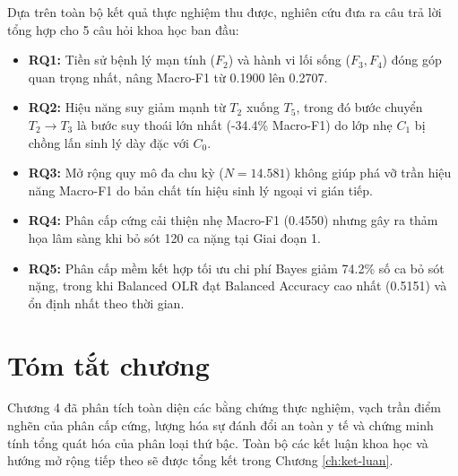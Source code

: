 Dựa trên toàn bộ kết quả thực nghiệm thu được, nghiên cứu đưa ra câu trả lời tổng hợp cho 5 câu hỏi khoa học ban đầu:
\begin{itemize}
    \item \textbf{RQ1:} Tiền sử bệnh lý mạn tính ($F_2$) và hành vi lối sống ($F_3, F_4$) đóng góp quan trọng nhất, nâng Macro-F1 từ 0.1900 lên 0.2707.
    \item \textbf{RQ2:} Hiệu năng suy giảm mạnh từ $T_2$ xuống $T_5$, trong đó bước chuyển $T_2 \to T_3$ là bước suy thoái lớn nhất (-34.4\% Macro-F1) do lớp nhẹ $C_1$ bị chồng lấn sinh lý dày đặc với $C_0$.
    \item \textbf{RQ3:} Mở rộng quy mô đa chu kỳ ($N=14.581$) không giúp phá vỡ trần hiệu năng Macro-F1 do bản chất tín hiệu sinh lý ngoại vi gián tiếp.
    \item \textbf{RQ4:} Phân cấp cứng cải thiện nhẹ Macro-F1 (0.4550) nhưng gây ra thảm họa lâm sàng khi bỏ sót 120 ca nặng tại Giai đoạn 1.
    \item \textbf{RQ5:} Phân cấp mềm kết hợp tối ưu chi phí Bayes giảm 74.2\% số ca bỏ sót nặng, trong khi Balanced OLR đạt Balanced Accuracy cao nhất (0.5151) và ổn định nhất theo thời gian.
\end{itemize}

\section{Tóm tắt chương}
\label{sec:tom-tat-chuong-4}

Chương 4 đã phân tích toàn diện các bằng chứng thực nghiệm, vạch trần điểm nghẽn của phân cấp cứng, lượng hóa sự đánh đổi an toàn y tế và chứng minh tính tổng quát hóa của phân loại thứ bậc. Toàn bộ các kết luận khoa học và hướng mở rộng tiếp theo sẽ được tổng kết trong Chương \ref{ch:ket-luan}.


